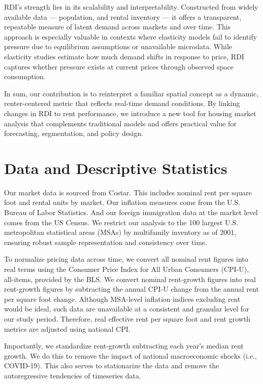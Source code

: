 \documentclass[APA,Times1COL]{WileyNJDv5} %
\begin{document}
RDI’s strength lies in its scalability and interpretability. Constructed from widely available data --- population, and rental inventory --- it offers a transparent, repeatable measure of latent demand across markets and over time. This approach is especially valuable in contexts where elasticity models fail to identify pressure due to equilibrium assumptions or unavailable microdata. While elasticity studies estimate how much demand shifts in response to price, RDI captures whether pressure exists at current prices through observed space consumption.

In sum, our contribution is to reinterpret a familiar spatial concept as a dynamic, renter-centered metric that reflects real-time demand conditions. By linking changes in RDI to rent performance, we introduce a new tool for housing market analysis that complements traditional models and offers practical value for forecasting, segmentation, and policy design.

\section{Data and Descriptive Statistics}\label{sec3}
Our market data is sourced from Costar. This includes nominal rent per square foot and rental units by market. Our inflation measures come from the U.S. Bureau of Labor Statistics. And our foreign immigration data at the market level comes from the US Census. We restrict our analysis to the 100 largest U.S. metropolitan statistical areas (MSAs) by multifamily inventory as of 2001, ensuring robust sample representation and consistency over time.

To normalize pricing data across time, we convert all nominal rent figures into real terms using the Consumer Price Index for All Urban Consumers (CPI-U), all-items, provided by the BLS. We convert nominal rent-growth figures into real rent-growth figures by subtracting the annual CPI-U change from the annual rent per square foot change. Although MSA-level inflation indices excluding rent would be ideal, such data are unavailable at a consistent and granular level for our study period. Therefore, real effective rent per square foot and rent growth metrics are adjusted using national CPI. 

Importantly, we standardize rent-growth subtracting each year's median rent growth. We do this to remove the impact of national macroeconomic shocks (i.e., COVID-19). This also serves to stationarize the data and remove the autoregressive tendencies of timeseries data.
\end{document}
